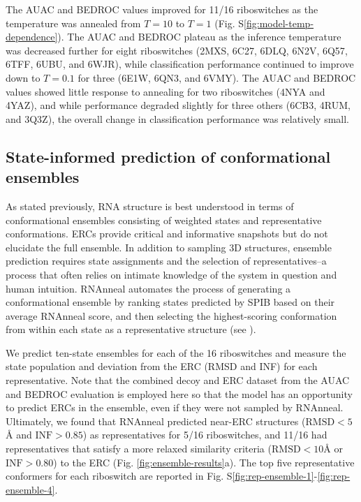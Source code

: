 \documentclass[%
aip,
 amsmath,amssymb,
reprint,%
twocolumn,
]{revtex4-1}
\begin{document}
{The AUAC and BEDROC values improved for 11/16 riboswitches as the temperature was annealed from $T=10$ to $T=1$ (Fig. S\ref{fig:model-temp-dependence}). The AUAC and BEDROC plateau as the inference temperature was decreased further for eight riboswitches (2MXS\cite{Schmidtke2015}, 6C27\cite{Grigg2018}, 6DLQ\cite{Peselis2018}, 6N2V\cite{Price2018}, 6Q57\cite{Dunstan2018}, 6TFF\cite{Huang2020}, 6UBU\cite{Matyjasik2019}, and 6WJR\cite{Wilt2020}), while classification performance continued to improve down to $T=0.1$ for three (6E1W\cite{Numata2019}, 6QN3\cite{Huang2019}, and 6VMY\cite{Chan2020}). The AUAC and BEDROC values showed little response to annealing for two riboswitches (4NYA\cite{Warner2014} and 4YAZ\cite{ren2015structural}), and while performance degraded slightly for three others (6CB3\cite{Bachas2018}, 4RUM\cite{Ramesh2014}, and 3Q3Z\cite{Smith2010}), the overall change in classification performance was relatively small.

\subsection*{State-informed prediction of conformational ensembles}

As stated previously, RNA structure is best understood in terms of conformational ensembles consisting of weighted states and representative conformations. ERCs provide critical and informative snapshots but do not elucidate the full ensemble. In addition to sampling 3D structures, ensemble prediction requires state assignments and the selection of representatives--a process that often relies on intimate knowledge of the system in question and human intuition. RNAnneal automates the process of generating a conformational ensemble by ranking states predicted by SPIB based on their average RNAnneal score, and then selecting the highest-scoring conformation from within each state as a representative structure (see ).

We predict ten-state ensembles for each of the 16 riboswitches and measure the state population and deviation from the ERC (RMSD and INF) for each representative. Note that the combined decoy and ERC dataset from the AUAC and BEDROC evaluation is employed here so that the model has an opportunity to predict ERCs in the ensemble, even if they were not sampled by RNAnneal. Ultimately, we found that RNAnneal predicted near-ERC structures ($\mathrm{RMSD}<5${\AA} and $\mathrm{INF}>0.85$) as representatives for 5/16 riboswitches, and 11/16 had representatives that satisfy a more relaxed similarity criteria ($\mathrm{RMSD}<10${\AA} or $\mathrm{INF}>0.80$) to the ERC (Fig. \ref{fig:ensemble-results}a). The top five representative conformers for each riboswitch are reported in Fig. S\ref{fig:rep-ensemble-1}-\ref{fig:rep-ensemble-4}.

}
\end{document}
